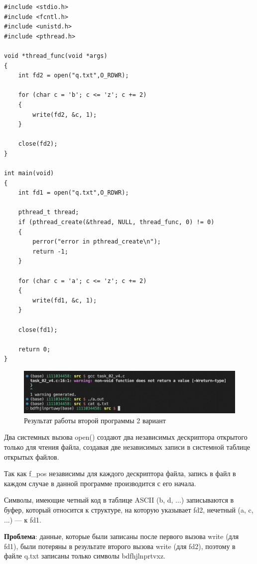 \begin{center}
\captionsetup{justification=raggedright,singlelinecheck=off}
\begin{lstlisting}[label=lst:add,caption=Вторая программа (с потоками) 2 вариант]
#include <stdio.h>
#include <fcntl.h>
#include <unistd.h>
#include <pthread.h>

void *thread_func(void *args)
{
  	int fd2 = open("q.txt",O_RDWR);

    for (char c = 'b'; c <= 'z'; c += 2)
    {
        write(fd2, &c, 1);
    }
    
    close(fd2);
}

int main(void)
{
 	int fd1 = open("q.txt",O_RDWR);
    
    pthread_t thread;
    if (pthread_create(&thread, NULL, thread_func, 0) != 0)
	{
		perror("error in pthread_create\n");
		return -1;
	}

    for (char c = 'a'; c <= 'z'; c += 2)
    {
        write(fd1, &c, 1);
    }

    close(fd1);

    return 0;
}

\end{lstlisting}
\end{center}

\begin{figure}[H]
	\centering
	\includegraphics[scale=0.7]{inc/img/task_02_v4.png}
	\caption{Результат работы второй программы 2 вариант}
	\label{fig:prog_022_thread}
\end{figure}

Два системных вызова open() создают два независимых дескриптора открытого только для чтения файла, создавая две независимых записи в системной таблице открытых файлов.

Так как f\_pos независимы для каждого дескриптора файла, запись в файл в каждом случае  в данной программе производится с его начала.

Символы, имеющие четный код в таблице ASCII  (b, d, ...) записываются в буфер, который относится к структуре, на которую указывает fd2, нечетный (a, c, ...) --- к fd1. 

\textbf{Проблема}: данные, которые были записаны после первого вызова write (для fd1), были потеряны в результате второго вызова write (для fd2), поэтому в файле q.txt записаны только символы bdfhjlnprtvxz.

